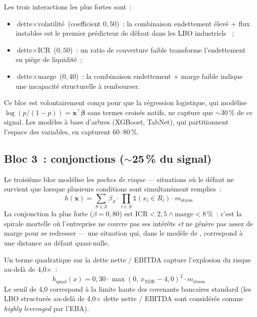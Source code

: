 \documentclass[12pt, a4paper, twoside, openright]{report}
\theoremstyle{definition}
\begin{document}
Les trois interactions les plus fortes sont~:
\begin{itemize}[nosep]
  \item $\text{dette} \times \text{volatilité}$ (coefficient $0{,}50$)~: la combinaison endettement élevé + flux instables est le premier prédicteur de défaut dans les LBO industriels \citep{hosmer_lemeshow2013}~;
  \item $\text{dette} \times \text{ICR}$ ($0{,}50$)~: un ratio de couverture faible transforme l'endettement en piège de liquidité~;
  \item $\text{dette} \times \text{marge}$ ($0{,}40$)~: la combinaison endettement + marge faible indique une incapacité structurelle à rembourser.
\end{itemize}

Ce bloc est volontairement conçu pour que la régression logistique, qui modélise $\log(p/(1-p)) = \mathbf{x}^\top \boldsymbol{\beta}$ sans termes croisés natifs, ne capture que $\sim$30\,\% de ce signal.
Les modèles à base d'arbres (XGBoost, TabNet), qui partitionnent l'espace des variables, en capturent 60--80\,\%.

\subsection{Bloc 3~: conjonctions ($\sim$25\,\% du signal)}

Le troisième bloc modélise les \emph{poches de risque} --- situations où le défaut ne survient que lorsque plusieurs conditions sont simultanément remplies~:
%
\begin{equation}
\label{eq:bloc3}
h(\mathbf{x}) = \sum_{S \in \mathcal{S}} \beta_S \cdot \prod_{i \in S} \mathbb{1}(x_i \in R_i) \cdot m_{\text{stress}}
\end{equation}
%
La conjonction la plus forte ($\beta = 0{,}80$) est $\text{ICR} < 2{,}5 \wedge \text{marge} < 8\,\%$~: c'est la \og spirale mortelle \fg{} où l'entreprise ne couvre pas ses intérêts \emph{et} ne génère pas assez de marge pour se redresser --- une situation qui, dans le modèle de \citet{merton1974}, correspond à une distance au défaut quasi-nulle.

Un terme quadratique sur la dette nette / EBITDA capture l'explosion du risque au-delà de 4{,}0$\times$~:
%
\begin{equation}
h_{\text{quad}}(x) = 0{,}30 \cdot \max(0,\, x_{\text{NDE}} - 4{,}0)^2 \cdot m_{\text{stress}}
\end{equation}
%
Le seuil de 4{,}0 correspond à la limite haute des covenants bancaires standard (les LBO structurés au-delà de 4{,}0$\times$ dette nette / EBITDA sont considérés comme \emph{highly leveraged} par l'EBA).
\end{document}
